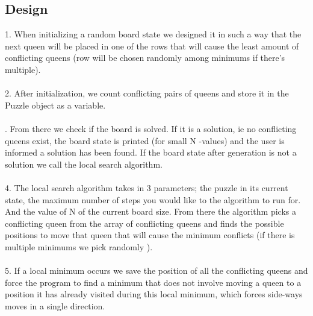\documentclass{article}
\begin{document}
 \subsection{Design} 
 1. When initializing a random board state we designed it in such a way that the next queen will be placed in one of the rows that will cause the least amount of conflicting queens (row will be chosen randomly among minimums if there's multiple).  \\
 \\
 2. After initialization, we count conflicting pairs of queens and store it in the Puzzle object as a variable. \\ 
 \\
. From there we check if the board is solved. If it is a solution, ie no conflicting queens exist, the board state is printed (for small N -values) and the user is informed a solution has been found. If the board state after generation is not a solution we call the local search algorithm.\\
 \\
 4. The local search algorithm takes in 3 parameters; the puzzle in its current state, the maximum number of steps you would like to the algorithm to run for. And the value of N of the current board size. From there the algorithm picks a conflicting queen from the array of conflicting queens and finds the possible positions to move that queen that will cause the minimum conflicts (if there is multiple minimums we pick randomly ). \\
 \\
 5. If a local minimum occurs we save the position of all the conflicting queens and force the program to find a minimum that does not involve moving a queen to a position it has already visited during this local minimum, which forces side-ways moves in a single direction.\\ 
  \\
\end{document}
